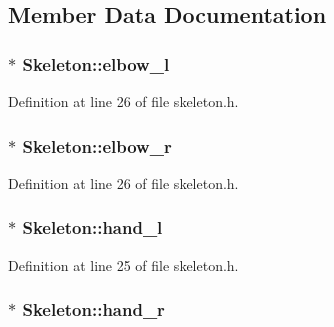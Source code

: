 \subsection{Member Data Documentation}
\hypertarget{class_skeleton_a3ffb0549ea2c7866d5ae7ca5a4b3d49a}{
\subsubsection[{elbow\+\_\+l}]{ $\ast$ Skeleton\+::elbow\+\_\+l}}\label{class_skeleton_a3ffb0549ea2c7866d5ae7ca5a4b3d49a}


Definition at line 26 of file skeleton.\+h.

\hypertarget{class_skeleton_a61337002c2e590b108b3865d52110983}{
\subsubsection[{elbow\+\_\+r}]{$\ast$ Skeleton\+::elbow\+\_\+r}}\label{class_skeleton_a61337002c2e590b108b3865d52110983}


Definition at line 26 of file skeleton.\+h.

\hypertarget{class_skeleton_a3dc91eda04e16c494e8e4bff81fe982c}{
\subsubsection[{hand\+\_\+l}]{ $\ast$ Skeleton\+::hand\+\_\+l}}\label{class_skeleton_a3dc91eda04e16c494e8e4bff81fe982c}


Definition at line 25 of file skeleton.\+h.

\hypertarget{class_skeleton_aaacf1c662b8e4d8940d9e6e42693038d}{
\subsubsection[{hand\+\_\+r}]{$\ast$ Skeleton\+::hand\+\_\+r}}\label{class_skeleton_aaacf1c662b8e4d8940d9e6e42693038d}


